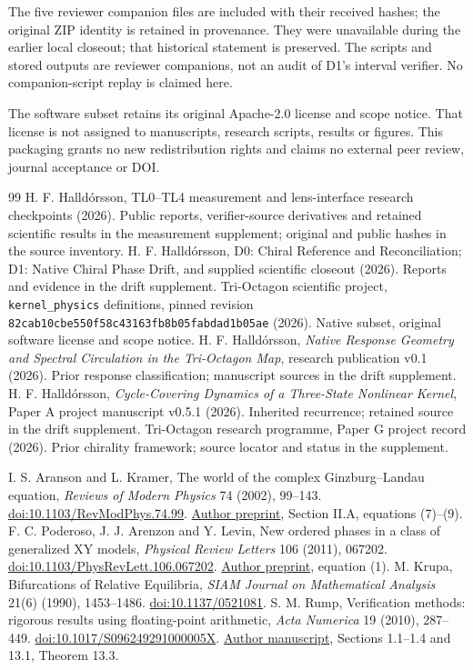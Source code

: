 \documentclass[11pt,a4paper]{article}
\begin{document}
The five reviewer companion files are included with their received hashes; the original ZIP identity is retained in provenance. They were unavailable during the earlier local closeout; that historical statement is preserved. The scripts and stored outputs are reviewer companions, not an audit of D1's interval verifier. No companion-script replay is claimed here.

The software subset retains its original Apache-2.0 license and scope notice. That license is not assigned to manuscripts, research scripts, results or figures. This packaging grants no new redistribution rights and claims no external peer review, journal acceptance or DOI.

\clearpage

\begin{thebibliography}{99}
 H. F. Halldórsson, TL0--TL4 measurement and lens-interface research checkpoints (2026). Public reports, verifier-source derivatives and retained scientific results in the measurement supplement; original and public hashes in the source inventory.
 H. F. Halldórsson, D0: Chiral Reference and Reconciliation; D1: Native Chiral Phase Drift, and supplied scientific closeout (2026). Reports and evidence in the drift supplement.
 Tri-Octagon scientific project, \texttt{kernel\_physics} definitions, pinned revision \texttt{82cab10cbe550f58c43163fb8b05fabdad1b05ae} (2026). Native subset, original software license and scope notice.
 H. F. Halldórsson, \emph{Native Response Geometry and Spectral Circulation in the Tri-Octagon Map}, research publication v0.1 (2026). Prior response classification; manuscript sources in the drift supplement.
 H. F. Halldórsson, \emph{Cycle-Covering Dynamics of a Three-State Nonlinear Kernel}, Paper A project manuscript v0.5.1 (2026). Inherited recurrence; retained source in the drift supplement.
 Tri-Octagon research programme, Paper G project record (2026). Prior chirality framework; source locator and status in the supplement.

 I. S. Aranson and L. Kramer, The world of the complex Ginzburg--Landau equation, \emph{Reviews of Modern Physics} 74 (2002), 99--143. \href{https://doi.org/10.1103/RevModPhys.74.99}{doi:10.1103/RevModPhys.74.99}. \href{https://arxiv.org/abs/cond-mat/0106115}{Author preprint}, Section II.A, equations (7)--(9).
 F. C. Poderoso, J. J. Arenzon and Y. Levin, New ordered phases in a class of generalized XY models, \emph{Physical Review Letters} 106 (2011), 067202. \href{https://doi.org/10.1103/PhysRevLett.106.067202}{doi:10.1103/PhysRevLett.106.067202}. \href{https://arxiv.org/abs/1008.0868}{Author preprint}, equation (1).
 M. Krupa, Bifurcations of Relative Equilibria, \emph{SIAM Journal on Mathematical Analysis} 21(6) (1990), 1453--1486. \href{https://doi.org/10.1137/0521081}{doi:10.1137/0521081}.
 S. M. Rump, Verification methods: rigorous results using floating-point arithmetic, \emph{Acta Numerica} 19 (2010), 287--449. \href{https://doi.org/10.1017/S096249291000005X}{doi:10.1017/S096249291000005X}. \href{https://www.tuhh.de/ti3/rump/intlab/ActaNumerica2010.pdf}{Author manuscript}, Sections 1.1--1.4 and 13.1, Theorem 13.3.

\end{thebibliography}
\end{document}
